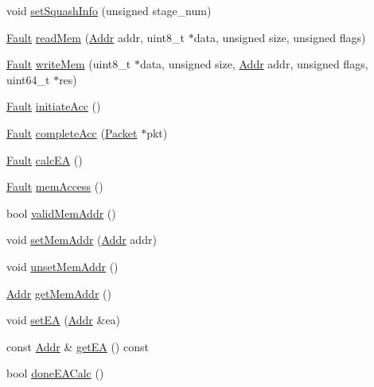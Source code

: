 \begin{DoxyCompactItemize}
\item 
void \hyperlink{classInOrderDynInst_aaed94af317e50d33bf94c74c423eabea}{setSquashInfo} (unsigned stage\_\-num)
\item 
\hyperlink{classRefCountingPtr}{Fault} \hyperlink{classInOrderDynInst_a66191b2d8a45050b7df3c3efa7bb07c6}{readMem} (\hyperlink{base_2types_8hh_af1bb03d6a4ee096394a6749f0a169232}{Addr} addr, uint8\_\-t $\ast$data, unsigned size, unsigned flags)
\item 
\hyperlink{classRefCountingPtr}{Fault} \hyperlink{classInOrderDynInst_ad46c5edeb1ee9b60445f3e26364e2c5e}{writeMem} (uint8\_\-t $\ast$data, unsigned size, \hyperlink{base_2types_8hh_af1bb03d6a4ee096394a6749f0a169232}{Addr} addr, unsigned flags, uint64\_\-t $\ast$res)
\item 
\hyperlink{classRefCountingPtr}{Fault} \hyperlink{classInOrderDynInst_af8310f8618e710a06b0c2cbface6ac72}{initiateAcc} ()
\item 
\hyperlink{classRefCountingPtr}{Fault} \hyperlink{classInOrderDynInst_a1aa06ef95247e55d679456d24fb20456}{completeAcc} (\hyperlink{classPacket}{Packet} $\ast$pkt)
\item 
\hyperlink{classRefCountingPtr}{Fault} \hyperlink{classInOrderDynInst_a1a338741bddb2eb956bda5a4188949cf}{calcEA} ()
\item 
\hyperlink{classRefCountingPtr}{Fault} \hyperlink{classInOrderDynInst_a59a68ea55d45f5f193a5f0396b79e036}{memAccess} ()
\item 
bool \hyperlink{classInOrderDynInst_a3720de22b955e2c018eac091cd9247cc}{validMemAddr} ()
\item 
void \hyperlink{classInOrderDynInst_a26ecfda1674171a0405414561a59d4d1}{setMemAddr} (\hyperlink{base_2types_8hh_af1bb03d6a4ee096394a6749f0a169232}{Addr} addr)
\item 
void \hyperlink{classInOrderDynInst_a4f1222744b70f43999a2f9a0455eb44f}{unsetMemAddr} ()
\item 
\hyperlink{base_2types_8hh_af1bb03d6a4ee096394a6749f0a169232}{Addr} \hyperlink{classInOrderDynInst_aa48b472bbabe0d9826b5f06204d1fcfe}{getMemAddr} ()
\item 
void \hyperlink{classInOrderDynInst_addd147868ea9ed46b5c943b0eaa57544}{setEA} (\hyperlink{base_2types_8hh_af1bb03d6a4ee096394a6749f0a169232}{Addr} \&ea)
\item 
const \hyperlink{base_2types_8hh_af1bb03d6a4ee096394a6749f0a169232}{Addr} \& \hyperlink{classInOrderDynInst_a6fd9d852d5780eb802b4d2520e58747b}{getEA} () const 
\item 
bool \hyperlink{classInOrderDynInst_a2f1c9119ee950f8afc730ea9d6e92d84}{doneEACalc} ()

\end{DoxyCompactItemize}
